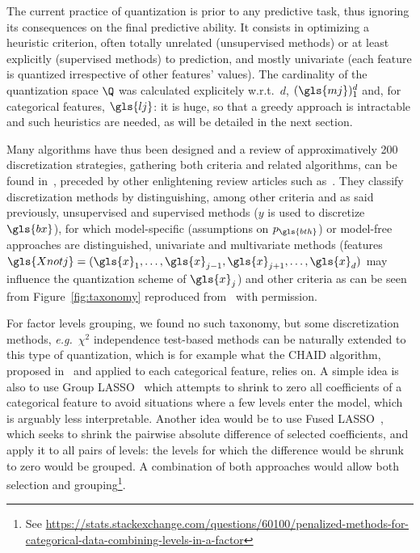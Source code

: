 The current practice of quantization is prior to any predictive task, thus ignoring its consequences on the final predictive ability. It consists in optimizing a heuristic criterion, often totally unrelated (unsupervised methods) or at least explicitly (supervised methods) to prediction, and mostly univariate (each feature is quantized irrespective of other features' values). The cardinality of the quantization space $\Q$ was calculated explicitely w.r.t.\ $d$, $(\gls{mj})_1^d$ and, for categorical features, $\gls{lj}$: it is huge, so that a greedy approach is intractable and such heuristics are needed, as will be detailed in the next section.

Many algorithms have thus been designed and a review of approximatively 200 discretization strategies, gathering both criteria and related algorithms, can be found in~\cite{ramirez2016data}, preceded by other enlightening review articles such as~\cite{dougherty1995supervised,liu2002discretization}. They classify discretization methods by distinguishing, among other criteria and as said previously, unsupervised and supervised methods ($y$ is used to discretize $\gls{bx}$), for which model-specific (assumptions on $p_{\gls{bth}}$) or model-free approaches are distinguished, univariate and multivariate methods (features $\gls{Xnotj} = (\gls{x}_{1},\ldots,\gls{x}_{j-1},\gls{x}_{j+1},\ldots,\gls{x}_{d})$ may influence the quantization scheme of $\gls{x}_j$) and other criteria as can be seen from Figure~\ref{fig:taxonomy} reproduced from~\cite{ramirez2016data} with permission. 

For factor levels grouping, we found no such taxonomy, but some discretization methods, \textit{e.g.}\ $\chi^2$ independence test-based methods can be naturally extended to this type of quantization, which is for example what the CHAID algorithm, proposed in~\cite{kass1980exploratory} and applied to each categorical feature, relies on. A simple idea is also to use Group LASSO~\cite{meier2008group} which attempts to shrink to zero all coefficients of a categorical feature to avoid situations where a few levels enter the model, which is arguably less interpretable. Another idea would be to use Fused LASSO~\cite{tibshirani2005sparsity}, which seeks to shrink the pairwise absolute difference of selected coefficients, and apply it to all pairs of levels: the levels for which the difference would be shrunk to zero would be grouped. A combination of both approaches would allow both selection and grouping\footnote{See \url{https://stats.stackexchange.com/questions/60100/penalized-methods-for-categorical-data-combining-levels-in-a-factor}}.

